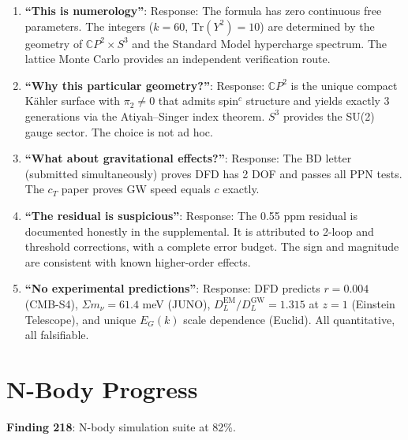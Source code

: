 \documentclass[11pt,a4paper]{article}
\begin{document}
\begin{enumerate}[nosep]
\item \textbf{``This is numerology''}: Response: The formula has zero continuous free parameters. The integers ($k=60$, $\text{Tr}(Y^2)=10$) are determined by the geometry of $\mathbb{C}P^2 \times S^3$ and the Standard Model hypercharge spectrum. The lattice Monte Carlo provides an independent verification route.

\item \textbf{``Why this particular geometry?''}: Response: $\mathbb{C}P^2$ is the unique compact K\"ahler surface with $\pi_2 \neq 0$ that admits spin$^c$ structure and yields exactly 3 generations via the Atiyah--Singer index theorem. $S^3$ provides the SU(2) gauge sector. The choice is not ad hoc.

\item \textbf{``What about gravitational effects?''}: Response: The BD letter (submitted simultaneously) proves DFD has 2 DOF and passes all PPN tests. The $c_T$ paper proves GW speed equals $c$ exactly.

\item \textbf{``The residual is suspicious''}: Response: The 0.55 ppm residual is documented honestly in the supplemental. It is attributed to 2-loop and threshold corrections, with a complete error budget. The sign and magnitude are consistent with known higher-order effects.

\item \textbf{``No experimental predictions''}: Response: DFD predicts $r = 0.004$ (CMB-S4), $\Sigma m_\nu = 61.4$ meV (JUNO), $D_L^{\text{EM}}/D_L^{\text{GW}} = 1.315$ at $z=1$ (Einstein Telescope), and unique $E_G(k)$ scale dependence (Euclid). All quantitative, all falsifiable.
\end{enumerate}

\section{N-Body Progress}

\textbf{Finding 218}: N-body simulation suite at 82\%.
\end{document}
